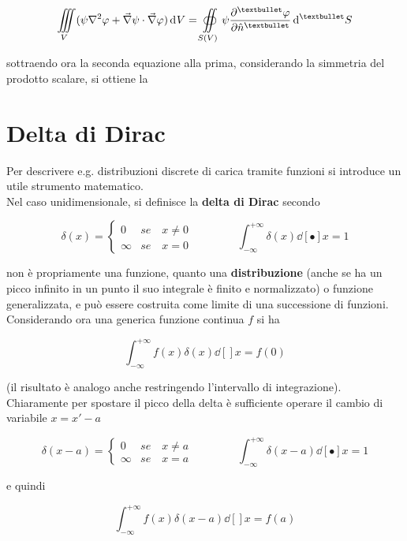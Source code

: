 \[\iiint\limits_V (\psi \laplacian \varphi + \vec{\nabla} \psi \cdot \vec{\nabla} \varphi) \dd[]{V} = \oiint\limits_{S(V)} \psi \pdv[•]{\varphi}{\hat{n}} \dd[•]{S}\]

sottraendo ora la seconda equazione alla prima, considerando la simmetria del prodotto scalare, si ottiene la 


\section{Delta di Dirac}

Per descrivere e.g. distribuzioni discrete di carica tramite funzioni si introduce un utile strumento matematico.
\\Nel caso unidimensionale, si definisce la \textbf{delta di Dirac} secondo

\[\delta (x) = \begin{cases}
0 & se \quad x \neq 0\\
\infty & se \quad x = 0
\end{cases} \qquad \qquad \int_{-\infty}^{+\infty} \delta(x) \dd[•]{x} = 1\]

non è propriamente una funzione, quanto una \textbf{distribuzione} (anche se ha un picco infinito in un punto il suo integrale è finito e normalizzato) o funzione generalizzata, e può essere costruita come limite di una successione di funzioni. 
\\Considerando ora una generica funzione continua $f$ si ha

\[\int_{-\infty}^{+\infty} f(x) \delta(x) \dd[]{x} = f(0)\]

(il risultato è analogo anche restringendo l'intervallo di integrazione). Chiaramente per spostare il picco della delta è sufficiente operare il cambio di variabile $x = x' - a$

\[\delta (x-a) = \begin{cases}
0 & se \quad x \neq a\\
\infty & se \quad x = a
\end{cases} \qquad \qquad \int_{-\infty}^{+\infty} \delta(x-a) \dd[•]{x} = 1\]

e quindi

\[\int_{-\infty}^{+\infty} f(x) \delta(x-a) \dd[]{x} = f(a)\]

